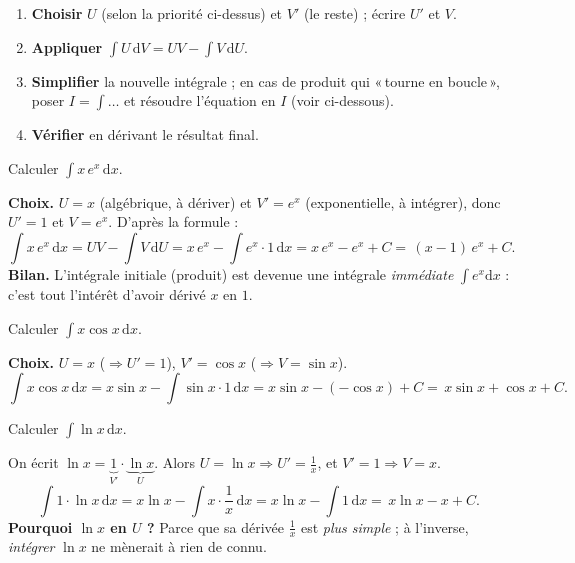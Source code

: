 \documentclass[11pt,a4paper]{article}
\newcommand{\dd}{\mathrm{d}}
\begin{document}
\begin{methode}
\begin{enumerate}[leftmargin=1.8em,topsep=2pt,itemsep=2pt]
  \item \textbf{Choisir} $U$ (selon la priorité ci-dessus) et $V'$ (le reste) ; écrire $U'$ et $V$.
  \item \textbf{Appliquer} $\int U\,\dd V=UV-\int V\,\dd U$.
  \item \textbf{Simplifier} la nouvelle intégrale ; en cas de produit qui «\,tourne en boucle\,»,
        poser $I=\int\ldots$ et résoudre l'équation en $I$ (voir ci-dessous).
  \item \textbf{Vérifier} en dérivant le résultat final.
\end{enumerate}
\end{methode}

\begin{exemple}
Calculer $\displaystyle\int x\,e^x\,\dd x$.

\smallskip
\textbf{Choix.} $U=x$ (algébrique, à dériver) et $V'=e^x$ (exponentielle, à intégrer), donc
$U'=1$ et $V=e^x$. D'après la formule :
\[
\int x\,e^x\,\dd x=UV-\int V\,\dd U=x\,e^x-\int e^x\cdot 1\,\dd x
=x\,e^x-e^x+C=\boxed{\,(x-1)\,e^x+C.\,}
\]
\textbf{Bilan.} L'intégrale initiale (produit) est devenue une intégrale \emph{immédiate}
$\int e^x\dd x$ : c'est tout l'intérêt d'avoir dérivé $x$ en $1$.
\end{exemple}

\begin{exemple}
Calculer $\displaystyle\int x\cos x\,\dd x$.

\smallskip
\textbf{Choix.} $U=x$ ($\Rightarrow U'=1$), $V'=\cos x$ ($\Rightarrow V=\sin x$).
\[
\int x\cos x\,\dd x=x\sin x-\int \sin x\cdot 1\,\dd x
=x\sin x-(-\cos x)+C=\boxed{\,x\sin x+\cos x+C.\,}
\]
\end{exemple}

\begin{exemple}
Calculer $\displaystyle\int \ln x\,\dd x$.

\smallskip
On écrit $\ln x = \underbrace{1}_{V'}\cdot\underbrace{\ln x}_{U}$. Alors
$U=\ln x\Rightarrow U'=\tfrac1x$, et $V'=1\Rightarrow V=x$.
\[
\int 1\cdot\ln x\,\dd x=x\ln x-\int x\cdot\frac1x\,\dd x
=x\ln x-\int 1\,\dd x=\boxed{\,x\ln x-x+C.\,}
\]
\textbf{Pourquoi $\ln x$ en $U$ ?} Parce que sa dérivée $\tfrac1x$ est \emph{plus simple} ; à
l'inverse, \emph{intégrer} $\ln x$ ne mènerait à rien de connu.
\end{exemple}
\end{document}

